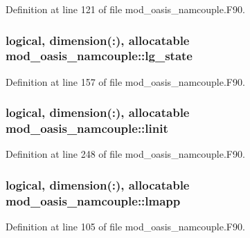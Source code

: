 Definition at line 121 of file mod\+\_\+oasis\+\_\+namcouple.\+F90.

\hypertarget{classmod__oasis__namcouple_ac1be1629c1369b96a4ff08c07200a05d}{
\subsubsection[{lg\+\_\+state}]{\setlength{\rightskip}{0pt plus 5cm}logical, dimension(\+:), allocatable mod\+\_\+oasis\+\_\+namcouple\+::lg\+\_\+state\hspace{0.3cm}{\ttfamily [private]}}}\label{classmod__oasis__namcouple_ac1be1629c1369b96a4ff08c07200a05d}


Definition at line 157 of file mod\+\_\+oasis\+\_\+namcouple.\+F90.

\hypertarget{classmod__oasis__namcouple_ac124af3aecadc7ba436f2ee6caffee9a}{
\subsubsection[{linit}]{\setlength{\rightskip}{0pt plus 5cm}logical, dimension(\+:), allocatable mod\+\_\+oasis\+\_\+namcouple\+::linit\hspace{0.3cm}{\ttfamily [private]}}}\label{classmod__oasis__namcouple_ac124af3aecadc7ba436f2ee6caffee9a}


Definition at line 248 of file mod\+\_\+oasis\+\_\+namcouple.\+F90.

\hypertarget{classmod__oasis__namcouple_a8eca7c715a39c523e00ed2be0612950d}{
\subsubsection[{lmapp}]{\setlength{\rightskip}{0pt plus 5cm}logical, dimension(\+:), allocatable mod\+\_\+oasis\+\_\+namcouple\+::lmapp\hspace{0.3cm}{\ttfamily [private]}}}\label{classmod__oasis__namcouple_a8eca7c715a39c523e00ed2be0612950d}


Definition at line 105 of file mod\+\_\+oasis\+\_\+namcouple.\+F90.

